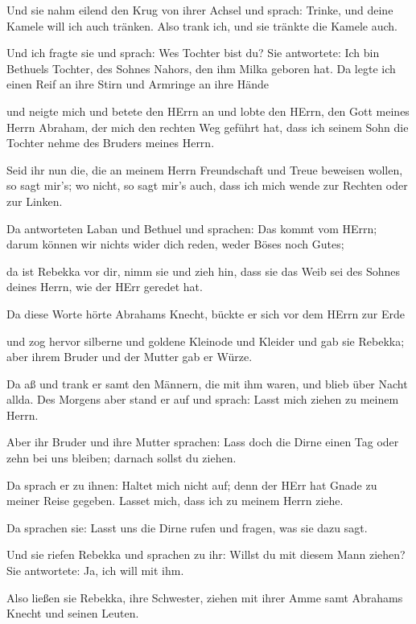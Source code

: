  Und sie nahm eilend den Krug von ihrer Achsel und sprach:
Trinke, und deine Kamele will ich auch tränken. Also trank ich, und sie
tränkte die Kamele auch.

 Und ich fragte sie und sprach: Wes Tochter bist du? Sie
antwortete: Ich bin Bethuels Tochter, des Sohnes Nahors, den ihm Milka
geboren hat. Da legte ich einen Reif an ihre Stirn und Armringe an ihre
Hände

 und neigte mich und betete den HErrn an und lobte den
HErrn, den Gott meines Herrn Abraham, der mich den rechten Weg geführt
hat, dass ich seinem Sohn die Tochter nehme des Bruders meines Herrn.

 Seid ihr nun die, die an meinem Herrn Freundschaft und
Treue beweisen wollen, so sagt mir's; wo nicht, so sagt mir's auch, dass
ich mich wende zur Rechten oder zur Linken.

 Da antworteten Laban und Bethuel und sprachen: Das kommt
vom HErrn; darum können wir nichts wider dich reden, weder Böses noch
Gutes;

 da ist Rebekka vor dir, nimm sie und zieh hin, dass sie
das Weib sei des Sohnes deines Herrn, wie der HErr geredet hat.

 Da diese Worte hörte Abrahams Knecht, bückte er sich vor
dem HErrn zur Erde

 und zog hervor silberne und goldene Kleinode und Kleider
und gab sie Rebekka; aber ihrem Bruder und der Mutter gab er Würze.

 Da aß und trank er samt den Männern, die mit ihm waren,
und blieb über Nacht allda. Des Morgens aber stand er auf und sprach:
Lasst mich ziehen zu meinem Herrn.

 Aber ihr Bruder und ihre Mutter sprachen: Lass doch die
Dirne einen Tag oder zehn bei uns bleiben; darnach sollst du ziehen.

 Da sprach er zu ihnen: Haltet mich nicht auf; denn der
HErr hat Gnade zu meiner Reise gegeben. Lasset mich, dass ich zu meinem
Herrn ziehe.

 Da sprachen sie: Lasst uns die Dirne rufen und fragen, was
sie dazu sagt.

 Und sie riefen Rebekka und sprachen zu ihr: Willst du mit
diesem Mann ziehen? Sie antwortete: Ja, ich will mit ihm.

 Also ließen sie Rebekka, ihre Schwester, ziehen mit ihrer
Amme samt Abrahams Knecht und seinen Leuten.

